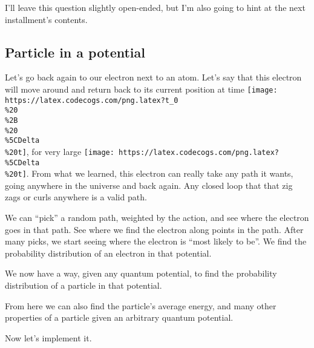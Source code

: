 \documentclass[]{article}
\begin{document}
I'll leave this question slightly open-ended, but I'm also going to hint at the
next installment's contents.

\subsection{Particle in a potential}\label{particle-in-a-potential}

Let's go back again to our electron next to an atom. Let's say that this
electron will move around and return back to its current position at time
\texttt{[image: https://latex.codecogs.com/png.latex?t\_0\\\%20\\\%2B\\\%20\\\%5CDelta\\\%20t]},
for very large
\texttt{[image: https://latex.codecogs.com/png.latex?\\\%5CDelta\\\%20t]}. From what
we learned, this electron can really take any path it wants, going anywhere in
the universe and back again. Any closed loop that that zig zags or curls
anywhere is a valid path.

We can ``pick'' a random path, weighted by the action, and see where the
electron goes in that path. See where we find the electron along points in the
path. After many picks, we start seeing where the electron is ``most likely to
be''. We find the probability distribution of an electron in that potential.

We now have a way, given any quantum potential, to find the probability
distribution of a particle in that potential.

From here we can also find the particle's average energy, and many other
properties of a particle given an arbitrary quantum potential.

Now let's implement it.
\end{document}
